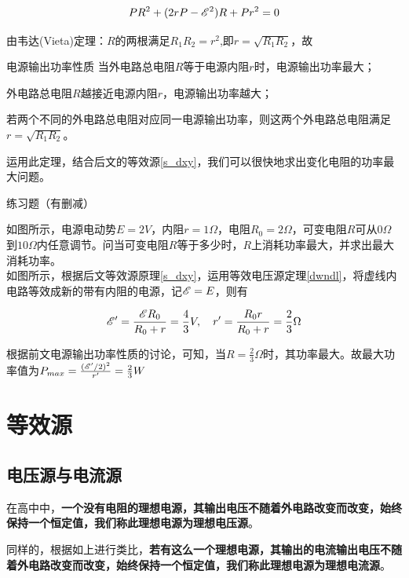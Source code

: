 $$P R^2 + (2 r P - \mathscr{E}^2)R + P r^2 = 0$$

由韦达(Vieta)定理：$R$的两根满足$R_1 R_2 = r^2$,即$r = \sqrt{R_1 R_2}$，故

\begin{theo}{电源输出功率性质}{}
当外电路总电阻$R$等于电源内阻$r$时，电源输出功率最大；

外电路总电阻$R$越接近电源内阻$r$，电源输出功率越大；

若两个不同的外电路总电阻对应同一电源输出功率，则这两个外电路总电阻满足$r = \sqrt{R_1 R_2}$。
\end{theo}

运用此定理，结合后文的等效源\eqref{s_dxy}，我们可以很快地求出变化电阻的功率最大问题。

\begin{ep}{练习题（有删减）}{}

如图所示，电源电动势$E=2V$，内阻$r=1\Omega$，电阻$R_0=2\Omega$，可变电阻$R$可从$0\Omega$到$10\Omega$内任意调节。问当可变电阻$R$等于多少时，$R$上消耗功率最大，并求出最大消耗功率。
~\\


如图所示，根据后文等效源原理\eqref{s_dxy}，运用等效电压源定理\eqref{dwndl}，将虚线内电路等效成新的带有内阻的电源，记$\mathscr{E} = E$，则有

$$\mathscr{E}^{\prime} = \frac{\mathscr{E} R_0}{R_0 + r} = \frac{4}{3} V ,\quad r^{\prime} = \frac{R_0 r}{R_0 + r} = \frac{2}{3} \Omega$$

根据前文电源输出功率性质的讨论，可知，当$R=\frac{2}{3} \Omega$时，其功率最大。故最大功率值为$P_{max} = \frac{(\mathscr{E}^{\prime} / 2)^2}{r^{\prime}} = \frac{2}{3} W$

\end{ep}

\section{等效源}
\label{s_dxy}

\subsection{电压源与电流源}

在高中中，\textbf{一个没有电阻的理想电源，其输出电压不随着外电路改变而改变，始终保持一个恒定值，我们称此理想电源为理想电压源}。

同样的，根据如上进行类比，\textbf{若有这么一个理想电源，其输出的电流输出电压不随着外电路改变而改变，始终保持一个恒定值，我们称此理想电源为理想电流源}。

